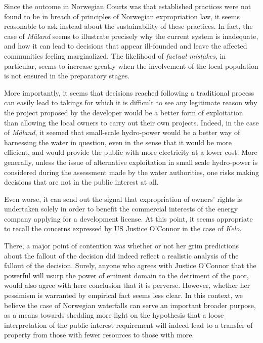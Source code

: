 Since the outcome in Norwegian Courts was that established practices were not found to be in breach of principles of Norwegian expropriation law, it seems reasonable to ask instead about the sustainability of these practices. In fact, the case of \emph{Måland} seems to illustrate precisely why the current system is inadequate, and how it can lead to decisions that appear ill-founded and leave the affected communities feeling marginalized. The likelihood of \emph{factual mistakes}, in particular, seems to increase greatly when the involvement of the local population is not ensured in the preparatory stages.

More importantly, it seems that decisions reached following a traditional process can easily lead to takings for which it is difficult to see any legitimate reason why the project proposed by the developer would be a better form of exploitation than allowing the local owners to carry out their own projects. Indeed, in the case of \emph{Måland}, it seemed that small-scale hydro-power would be a better way of harnessing the water in question, even in the sense that it would be more efficient, and would provide the public with more electricity at a lower cost. More generally, unless the issue of alternative exploitation in small scale hydro-power is considered during the assessment made by the water authorities, one risks making decisions that are not in the public interest at all. 

Even worse, it can send out the signal that expropriation of owners' rights is undertaken solely in order to benefit the commercial interests of the energy company applying for a development license. At this point, it seems appropriate to recall the concerns expressed by US Justice O'Connor in the case of {\it Kelo}.

There, a major point of contention was whether or not her grim predictions about the fallout of the decision did indeed reflect a realistic analysis of the fallout of the decision. Surely, anyone who agrees with Justice O'Connor that the powerful will usurp the power of eminent domain to the detriment of the poor, would also agree with here conclusion that it is perverse. However, whether her pessimism is warranted by empirical fact seems less clear. In this context, we believe the case of Norwegian waterfalls can serve an important broader purpose, as a means towards shedding more light on the hypothesis that a loose interpretation of the public interest requirement will indeed lead to a transfer of property from those with fewer resources to those with more. 

